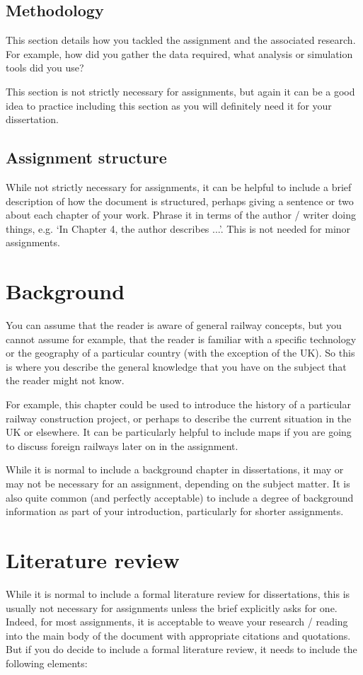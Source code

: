 \documentclass{bcrre_assignment}
\begin{document}
\section{Methodology}
This section details how you tackled the assignment and the associated research. For example, how did you gather the data required, what analysis or simulation tools did you use?

This section is not strictly necessary for assignments, but again it can be a good idea to practice including this section as you will definitely need it for your dissertation.

\section{Assignment structure}
While not strictly necessary for assignments, it can be helpful to include a brief description of how the document is structured, perhaps giving a sentence or two about each chapter of your work.  Phrase it in terms of the author / writer doing things, e.g. ‘In Chapter 4, the author describes ...’.  This is not needed for minor assignments. 

\chapter{Background}
You can assume that the reader is aware of general railway concepts, but you cannot assume for example, that the reader is familiar with a specific technology or the geography of a particular country (with the exception of the UK).  So this is where you describe the general knowledge that you have on the subject that the reader might not know.

For example, this chapter could be used to introduce the history of a particular railway construction project, or perhaps to describe the current situation in the UK or elsewhere.  It can be particularly helpful to include maps if you are going to discuss foreign railways later on in the assignment. 

While it is normal to include a background chapter in dissertations, it may or may not be necessary for an assignment, depending on the subject matter.  It is also quite common (and perfectly acceptable) to include a degree of background information as part of your introduction, particularly for shorter assignments.

\chapter{Literature review}
While it is normal to include a formal literature review for dissertations, this is usually not necessary for assignments unless the brief explicitly asks for one.  Indeed, for most assignments, it is acceptable to weave your research / reading into the main body of the document with appropriate citations and quotations.  But if you do decide to include a formal literature review, it needs to include the following elements:
\end{document}
